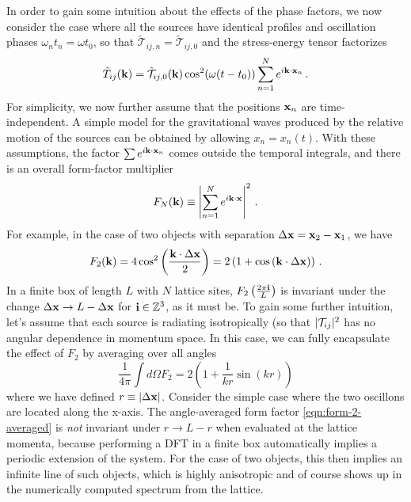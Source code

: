 \documentclass{revtex4}
\begin{document}
In order to gain some intuition about the effects of the phase factors,
we now consider the case where all the sources have identical profiles and oscillation phases $\omega_nt_n = \omega t_0$, so that $\tilde{\mathcal{T}}_{ij,n} = \tilde{\mathcal{T}}_{ij,0}$ and the stress-energy tensor factorizes
\begin{equation}
  \tilde{T}_{ij}({\bf k}) = \tilde{\mathcal{T}}_{ij,0}({\bf k})\cos^2(\omega (t-t_0)) \sum_{n=1}^N e^{i{\bf k}\cdot{\bf x}_n} \, .
\end{equation}
For simplicity, we now further assume that the positions ${\bf x}_n$ are time-independent.
A simple model for the gravitational waves produced by the relative motion of the sources can be obtained by allowing $x_n = x_n(t)$.
With these assumptions, the factor $\sum e^{i{\bf k}\cdot{\bf x}_n}$ comes outside the temporal integrals, and there is an overall form-factor multiplier
\begin{equation}
  F_N({\bf k}) \equiv \left|\sum_{n=1}^N e^{i{\bf k}\cdot{\bf x}}\right|^2 \, .
\end{equation}
For example, in the case of two objects with separation $\Delta{\bf x} = {\bf x}_2-{\bf x}_1$, we have
\begin{equation}
  F_2({\bf k}) = 4\cos^2\left(\frac{{\bf k}\cdot\Delta{\bf x}}{2}\right) = 2\left(1 + \cos\left({\bf k}\cdot\Delta{\bf x}\right)\right) \, .
\end{equation}
In a finite box of length $L$ with $N$ lattice sites, $F_2\left(\frac{2\pi {\bf i}}{L}\right)$ is invariant under the change $\Delta{\bf x} \to L - \Delta{\bf x}$ for ${\bf i}\in \mathbb{Z}^3$, as it must be.
To gain some further intuition, let's assume that each source is radiating isotropically (so that $|\mathcal{T}_{ij}|^2$ has no angular dependence in momentum space.
In this case, we can fully encapsulate the effect of $F_2$ by averaging over all angles
\begin{equation}
  \label{eqn:form-2-averaged}
  \frac{1}{4\pi}\int d\Omega F_2 = 2\left(1 + \frac{1}{kr}\sin\left(kr\right)\right)
\end{equation}
where we have defined $r \equiv |\Delta{\bf x}|$.
Consider the simple case where the two oscillons are located along the x-axis.
The angle-averaged form factor \eqref{eqn:form-2-averaged} is \emph{not} invariant under $r \to L - r$ when evaluated at the lattice momenta, because performing a DFT in a finite box automatically implies a periodic extension of the system.
For the case of two objects, this then implies an infinite line of such objects, which is highly anisotropic and of course shows up in the numerically computed spectrum from the lattice.
\end{document}
